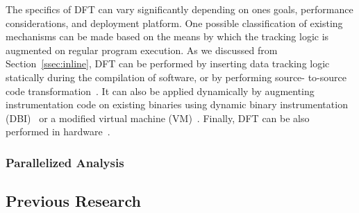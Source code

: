 The specifics of DFT can vary significantly depending on ones goals,
performance considerations, and deployment platform. One possible
classification of existing mechanisms can be made based on the means by which
the tracking logic is augmented on regular program execution. As we discussed
from Section~\ref{ssec:inline}, DFT can be performed by inserting data tracking
logic statically during the compilation of software, or by performing source-
to-source code transformation~\cite{}. It can also be applied dynamically by
augmenting instrumentation code on existing binaries using dynamic binary
instrumentation (DBI)~\cite{}  or a modified virtual machine (VM)~\cite{}.
Finally, DFT can be also performed in hardware~\cite{}.

\subsubsection{Parallelized Analysis}

\subsection{Previous Research}
\subsubsection{\libdft}
\subsubsection{\tfa}
\subsubsection{\sreplica}
